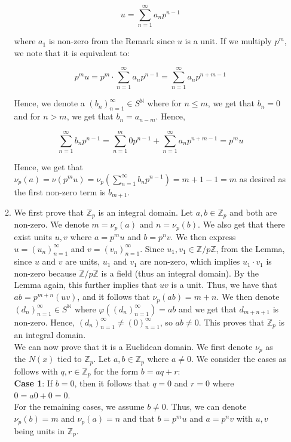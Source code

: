 \documentclass{article}
\begin{document}
\begin{enumerate}
\begin{enumerate}
    $$u = \sum^{\infty}_{n=1}a_n p^{n-1}$$

    where $a_1$ is non-zero from the Remark since $u$ is a unit. If we multiply $p^m$, we note that it is equivalent to: 

    $$p^m u = p^m \cdot \sum^{\infty}_{n=1}a_n p^{n-1} = \sum^{\infty}_{n=1}a_n p^{n + m-1} $$

    Hence, we denote a $(b_n)^{\infty}_{n=1} \in S^{\mathbb{N}}$ where for $n \leq m$, we get that $b_n = 0$ and for $n > m$, we get that $b_n = a_{n - m}$. Hence, 

    $$\sum^{\infty}_{n = 1}b_n p^{n-1} = \sum^{m}_{n = 1}0 p^{n-1} + \sum^{\infty}_{n=1}a_n p^{n + m-1} = p^m u$$

    Hence, we get that $\nu_p(a) = \nu(p^mu) = \nu_p(\sum^{\infty}_{n = 1}b_np^{n-1}) = m+1 - 1 = m$ as desired as the first non-zero term is $b_{m+1}$. 
    \\ 
    \item 
    We first prove that $\mathbb{Z}_p$ is an integral domain. Let $a, b \in \mathbb{Z}_p$ and both are non-zero. We denote $m = \nu_p(a)$ and $n = \nu_p(b)$. We also get that there exist units $u, v$ where $a = p^m u$ and $b = p^n v$. We then express $u = (u_n)_{n=1}^{\infty}$ and $v = (v_n)_{n=1}^{\infty}$. Since $u_1, v_1 \in \mathbb{Z}/p\mathbb{Z}$, from the Lemma, since $u$ and $v$ are units, $u_1$ and $v_1$ are non-zero, which implies $u_1 \cdot v_1$ is non-zero because $\mathbb{Z}/p\mathbb{Z}$ is a field (thus an integral domain). By the Lemma again, this further implies that $uv$ is a unit. Thus, we have that $ab = p^{m+n}(uv)$, and it follows that $\nu_p(ab) = m + n$. We then denote $(d_n)_{n=1}^{\infty} \in S^{\mathbb{N}}$ where $\varphi((d_n)_{n=1}^{\infty}) = ab$ and we get that $d_{m+n + 1}$ is non-zero. Hence, $(d_n)_{n=1}^{\infty} \neq (0)_{n=1}^{\infty}$, so $ab \neq 0$. This proves that $\mathbb{Z}_p$ is an integral domain.\\

    We can now prove that it is a Euclidean domain. We first denote $\nu_p$ as the $N(x)$ tied to $\mathbb{Z}_p$. Let $a, b \in \mathbb{Z}_p$ where $a \neq 0$. We consider the cases as follows with $q, r \in \mathbb{Z}_p$ for the form $b = aq + r$:\\

    \textbf{Case 1}: If $b = 0$, then it follows that $q = 0$ and $r = 0$ where $0 = a0 + 0 = 0$. \\

    For the remaining cases, we assume $b \neq 0$. Thus, we can denote $\nu_p(b) = m$ and $\nu_p(a) = n$ and that $b = p^m u$ and $a = p^n v$ with $u, v$ being units in $\mathbb{Z}_p$.\\


\end{enumerate}
\end{enumerate}
\end{document}

